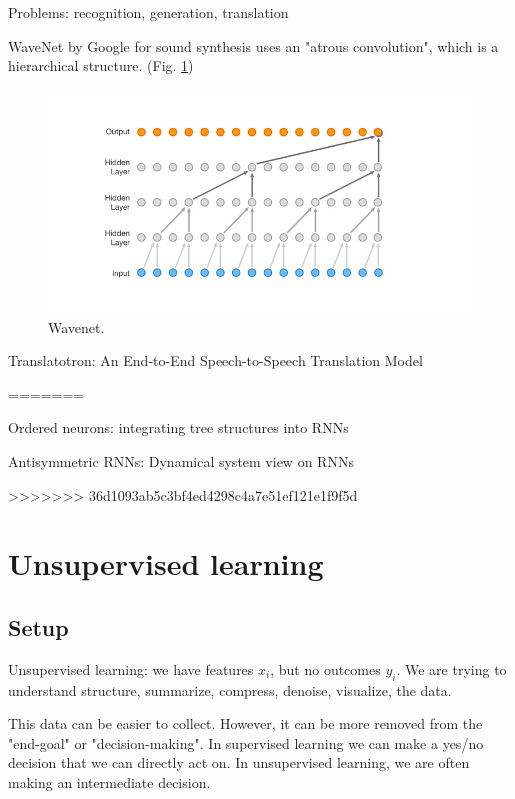 \documentclass[english]{article}
\begin{document}
Problems: recognition, generation, translation


WaveNet by Google for sound synthesis uses an "atrous convolution", which is a hierarchical structure. (Fig. \ref{wavenet})

\begin{figure}
  \centering
  \includegraphics[scale=0.8]{wavenet.jpg}
    \caption{Wavenet.}
    \label{wavenet}
\end{figure}

Translatotron: An End-to-End Speech-to-Speech Translation Model


=======
\item Ordered neurons: integrating tree structures into RNNs 

\item Antisymmetric RNNs: Dynamical system view on RNNs

>>>>>>> 36d1093ab5c3bf4ed4298c4a7e51ef121e1f9f5d
\eenum 

\section{Unsupervised learning}

\subsection{Setup}

\benum
\item Unsupervised learning: we have features $x_i$, but no outcomes $y_i$. We are trying to understand structure, summarize, compress, denoise, visualize, the data.

This data can be easier to collect. However, it can be more removed from the "end-goal" or "decision-making". In supervised learning we can make a yes/no decision that we can directly act on. In unsupervised learning, we are often making an intermediate decision. 
\end{document}

